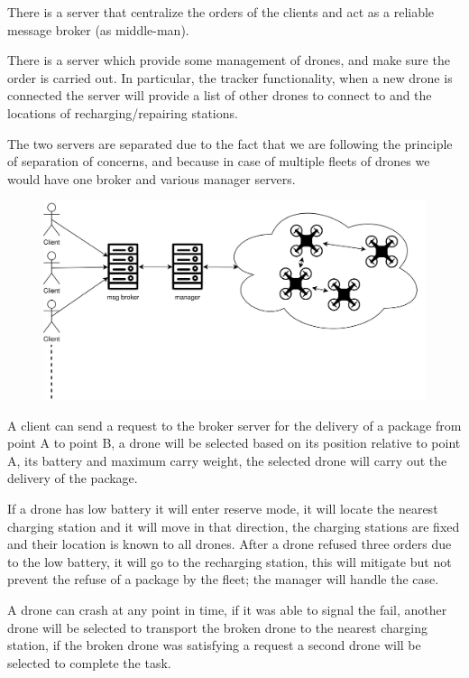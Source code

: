 \documentclass[a4paper, oneside]{memoir}
\begin{document}
There is a server that centralize the orders of the clients and act as a reliable message broker (as middle-man).

There is a server which provide some management of drones, and make sure the order is carried out. In particular, the tracker functionality, when a new drone is connected the server will provide a list of other drones to connect to and the locations of recharging/repairing stations.

The two servers are separated due to the fact that we are following the principle of separation of concerns, and because in case of multiple fleets of drones we would have one broker and various manager servers.

\begin{figure}[h!]
	\centering
	\includegraphics[width=\linewidth]{Overview}
\end{figure}

A client can send a request to the broker server for the delivery of a package from point A to point B, a drone will be selected based on its position relative to point A, its  battery and maximum carry weight, the selected drone will carry out the delivery of the package.

If a drone has low battery it will enter reserve mode, it will locate the nearest charging station and it will move in that direction, the charging stations are fixed and their location is known to all drones. After a drone refused three orders due to the low battery, it will go to the recharging station, this will mitigate but not prevent the refuse of a package by the fleet; the manager will handle the case.

A drone can crash at any point in time, if it was able to signal the fail, another drone will be selected to transport the broken drone to the nearest charging station, if the broken drone was satisfying a request a second drone will be selected to complete the task.
\end{document}
